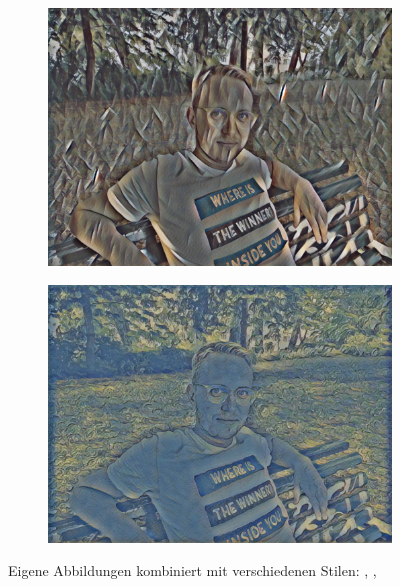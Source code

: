 \begin{figure}[H]
\begin{subfigure}[h]{0.21\textwidth}
        \includegraphics[width=\textwidth]{resources/content/experiments/ich-vgg16_still_life_with_liqueur_bottle.jpg}
    \end{subfigure}
    \begin{subfigure}[h]{0.21\textwidth}
        \centering
        \includegraphics[width=\textwidth]{resources/content/experiments/ich-vgg16_the_olive_trees.jpg}
    \end{subfigure}

    \caption{Eigene Abbildungen kombiniert mit verschiedenen Stilen: \cite{multicolored_abstract_artwork_img}, \cite{still_life_with_liqueur_bottle_img}, \cite{the_olive_trees_img}}
\end{figure}